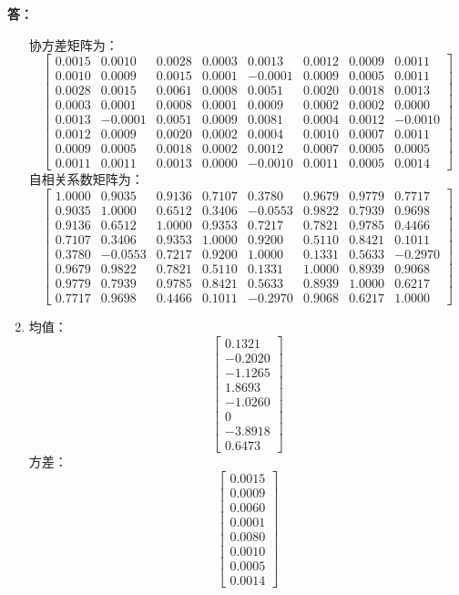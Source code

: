 \documentclass[12pt, a4paper, oneside]{article}
\newcounter{answername}
\newenvironment{answer}{\stepcounter{answername}\par\noindent\textbf{答：}}{\par}
\begin{document}
\begin{CJK*}{UTF8}{gbsn}
\begin{answer}
\begin{enumerate}
			协方差矩阵为：$$\left[\begin{array}{cccccccc}0.0015 & 0.0010 & 0.0028 & 0.0003 & 0.0013 & 0.0012 & 0.0009 & 0.0011 \\0.0010 & 0.0009 & 0.0015 & 0.0001 & -0.0001 & 0.0009 & 0.0005 & 0.0011 \\0.0028 & 0.0015 & 0.0061 & 0.0008 & 0.0051 & 0.0020 & 0.0018 & 0.0013 \\0.0003 & 0.0001 & 0.0008 & 0.0001 & 0.0009 & 0.0002 & 0.0002 & 0.0000 \\0.0013 & -0.0001 & 0.0051 & 0.0009 & 0.0081 & 0.0004 & 0.0012 & -0.0010 \\0.0012 & 0.0009 & 0.0020 & 0.0002 & 0.0004 & 0.0010 & 0.0007 & 0.0011 \\0.0009 & 0.0005 & 0.0018 & 0.0002 & 0.0012 & 0.0007 & 0.0005 & 0.0005 \\0.0011 & 0.0011 & 0.0013 & 0.0000 & -0.0010 & 0.0011 & 0.0005 & 0.0014 \end{array}\right]$$
			自相关系数矩阵为：
			$$\left[\begin{array}{cccccccc}1.0000 & 0.9035 & 0.9136 & 0.7107 & 0.3780 & 0.9679 & 0.9779 & 0.7717 \\0.9035 & 1.0000 & 0.6512 & 0.3406 & -0.0553 & 0.9822 & 0.7939 & 0.9698 \\0.9136 & 0.6512 & 1.0000 & 0.9353 & 0.7217 & 0.7821 & 0.9785 & 0.4466 \\0.7107 & 0.3406 & 0.9353 & 1.0000 & 0.9200 & 0.5110 & 0.8421 & 0.1011 \\0.3780 & -0.0553 & 0.7217 & 0.9200 & 1.0000 & 0.1331 & 0.5633 & -0.2970 \\0.9679 & 0.9822 & 0.7821 & 0.5110 & 0.1331 & 1.0000 & 0.8939 & 0.9068 \\0.9779 & 0.7939 & 0.9785 & 0.8421 & 0.5633 & 0.8939 & 1.0000 & 0.6217 \\0.7717 & 0.9698 & 0.4466 & 0.1011 & -0.2970 & 0.9068 & 0.6217 & 1.0000\end{array}\right]$$
		\item 均值：
			$$\left[\begin{array}{c}0.1321 \\ -0.2020 \\ -1.1265 \\ 1.8693 \\ -1.0260 \\ 0 \\ -3.8918 \\ 0.6473\end{array}\right]$$
			方差：
			$$\left[\begin{array}{c}0.0015 \\ 0.0009 \\ 0.0060 \\ 0.0001 \\ 0.0080 \\ 0.0010 \\ 0.0005 \\ 0.0014\end{array}\right]$$

\end{enumerate}
\end{answer}
\end{CJK*}
\end{document}
